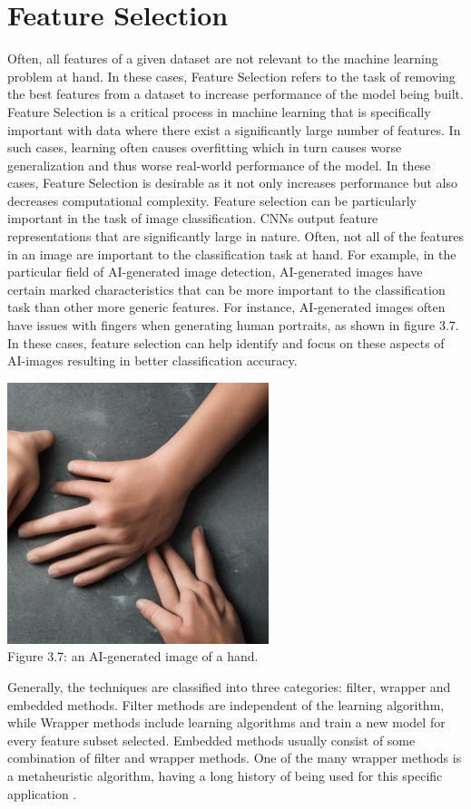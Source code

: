 \section{Feature Selection}
Often, all features of a given dataset are not relevant to the machine learning problem at hand. In these cases, Feature Selection refers to the task of removing the best features from a dataset to increase performance of the model being built. Feature Selection is a critical process in machine learning that is specifically important with data where there exist a significantly large number of features. In such cases, learning often causes overfitting which in turn causes worse generalization and thus worse real-world performance of the model. In these cases, Feature Selection is desirable as it not only increases performance but also decreases computational complexity. Feature selection can be particularly important in the task of image classification. CNNs output feature representations that are significantly large in nature. Often, not all of the features in an image are important to the classification task at hand. For example, in the particular field of AI-generated image detection, AI-generated images have certain marked characteristics that can be more important to the classification task than other more generic features. For instance, AI-generated images often have issues with fingers when generating human portraits, as shown in figure 3.7. In these cases, feature selection can help identify and focus on these aspects of AI-images resulting in better classification accuracy.


\begin{center}
   \includegraphics[width=3in]{images/3.7.png} 
   \\\fontsize{11pt}{24pt} Figure 3.7: an AI-generated image of a hand.
\end{center}



Generally, the techniques are classified into three categories: filter, wrapper and embedded methods. Filter methods are independent of the learning algorithm, while Wrapper methods include learning algorithms and train a new model for every feature subset selected. Embedded methods usually consist of some combination of filter and wrapper methods. One of the many wrapper methods is a metaheuristic algorithm, having a long history of being used for this specific application  \cite{13}. 
